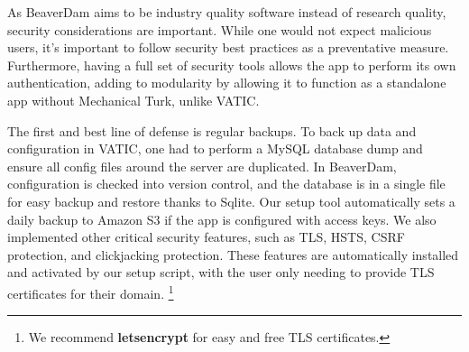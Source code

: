 As BeaverDam aims to be industry quality software instead of research quality, security considerations are important.
While one would not expect malicious users, it's important to follow security best practices as a preventative measure.
Furthermore, having a full set of security tools allows the app to perform its own authentication,
adding to modularity by allowing it to function as a standalone app without Mechanical Turk, unlike VATIC.

The first and best line of defense is regular backups.
To back up data and configuration in VATIC, one had to perform a MySQL database dump and ensure all config files around the server are duplicated.
In BeaverDam, configuration is checked into version control, and the database is in a single file for easy backup and restore thanks to Sqlite.
Our setup tool automatically sets a daily backup to Amazon S3 if the app is configured with access keys.
We also implemented other critical security features, such as TLS, HSTS, CSRF protection, and clickjacking protection.
These features are automatically installed and activated by our setup script,
with the user only needing to provide TLS certificates for their domain. \footnote{We recommend \textbf{letsencrypt} for easy and free TLS certificates.}


